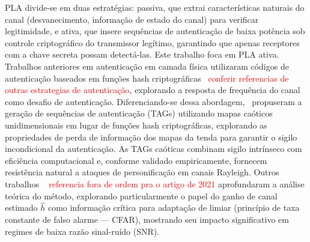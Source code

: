 \documentclass{sbrt}
\newcommand{\rred}[1]{\textcolor{red}{#1}}
\begin{document}
PLA divide-se em duas estratégias: passiva, que extrai características naturais do canal (desvanecimento, informação de estado do canal) para verificar legitimidade, e ativa, que insere sequências de autenticação de baixa potência sob controle criptográfico do transmissor legítimo, garantindo que apenas receptores com a chave secreta possam detectá-las. Este trabalho foca em PLA ativa. Trabalhos anteriores em autenticação em camada física utilizaram códigos de autenticação baseados em funções hash criptográficas~\cite{ref_hash_pla, ref_ldpc_auth} \rred{conferir referencias de outras estrategias de autenticação}, explorando a resposta de frequência do canal como desafio de autenticação. Diferenciando-se dessa abordagem,~\cite{ref_joao} propuseram a geração de sequências de autenticação (TAGs) utilizando mapas caóticos unidimensionais em lugar de funções hash criptográficas, explorando as propriedades de perda de informação dos mapas da tenda para garantir o sigilo incondicional da autenticação. As TAGs caóticas combinam sigilo intrínseco com eficiência computacional e, conforme validado empiricamente, fornecem resistência natural a ataques de personificação em canais Rayleigh. Outros trabalhos 
~\cite{ref_xie} \rred{referencia fora de ordem pra o artigo de 2021} aprofundaram a análise teórica do método, explorando particularmente o papel do ganho de canal estimado $\hat{h}$ como informação crítica para adaptação de limiar (princípio de taxa constante de falso alarme --- CFAR), mostrando seu impacto significativo em regimes de baixa razão sinal-ruído (SNR).
\end{document}
